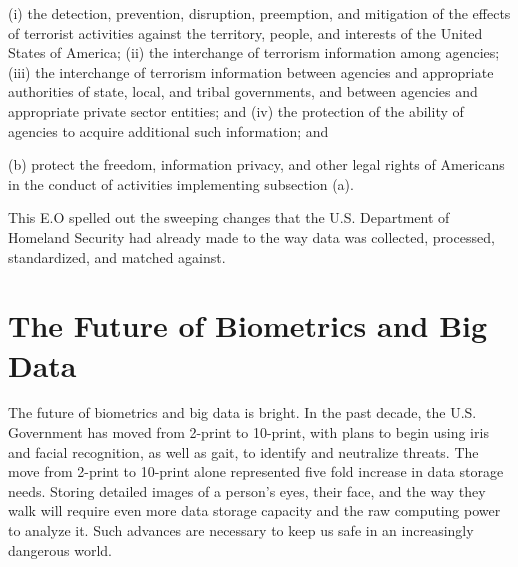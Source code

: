 \documentclass[sigconf]{acmart}
\begin{document}
        (i) the detection, prevention, disruption, preemption, and mitigation of the effects of terrorist activities against the territory, people, and interests of the United States of America; 
        (ii) the interchange of terrorism information among agencies; 
        (iii) the interchange of terrorism information between agencies and appropriate authorities of state, local, and tribal governments, and between agencies and appropriate private sector entities; and 
        (iv) the protection of the ability of agencies to acquire additional such information; and 
        
    (b) protect the freedom, information privacy, and other legal rights of Americans in the conduct of activities implementing subsection (a). 
    
This E.O spelled out the sweeping changes that the U.S. Department of Homeland Security had already made to the way data was collected, processed, standardized, and matched against. 

\section{The Future of Biometrics and Big Data}

The future of biometrics and big data is bright. In the past decade, the U.S. Government has moved from 2-print to 10-print, with plans to begin using iris and facial recognition, as well as gait, to identify and neutralize threats. The move from 2-print to 10-print alone represented five fold increase in data storage needs. Storing detailed images of a person's eyes, their face, and the way they walk will require even more data storage capacity and the raw computing power to analyze it. Such advances are necessary to keep us safe in an increasingly dangerous world.


 


\end{document}
